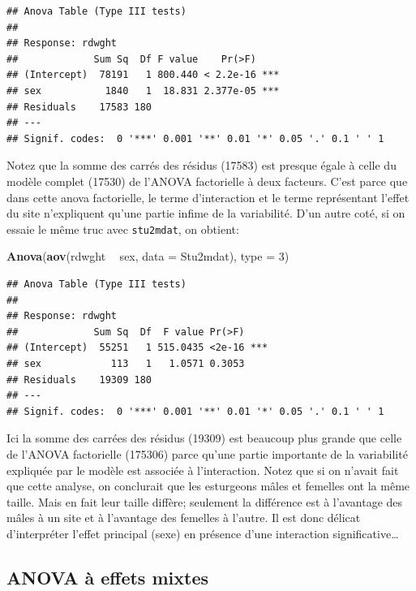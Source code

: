 \documentclass[12pt,]{book}
\newenvironment{Shaded}{\begin{snugshade}}{\end{snugshade}}
\newcommand{\DataTypeTok}[1]{\textcolor[rgb]{0.13,0.29,0.53}{#1}}
\newcommand{\DecValTok}[1]{\textcolor[rgb]{0.00,0.00,0.81}{#1}}
\newcommand{\KeywordTok}[1]{\textcolor[rgb]{0.13,0.29,0.53}{\textbf{#1}}}
\newcommand{\NormalTok}[1]{#1}
\newcommand{\OperatorTok}[1]{\textcolor[rgb]{0.81,0.36,0.00}{\textbf{#1}}}
\newcommand{\StringTok}[1]{\textcolor[rgb]{0.31,0.60,0.02}{#1}}
\begin{document}
\begin{verbatim}
## Anova Table (Type III tests)
## 
## Response: rdwght
##             Sum Sq  Df F value    Pr(>F)    
## (Intercept)  78191   1 800.440 < 2.2e-16 ***
## sex           1840   1  18.831 2.377e-05 ***
## Residuals    17583 180                      
## ---
## Signif. codes:  0 '***' 0.001 '**' 0.01 '*' 0.05 '.' 0.1 ' ' 1
\end{verbatim}

Notez que la somme des carrés des résidus (17583) est presque égale à celle du modèle complet (17530) de l'ANOVA factorielle à deux facteurs. C'est parce que dans cette anova factorielle, le terme d'interaction et le terme représentant l'effet du site n'expliquent qu'une partie infime de la variabilité. D'un autre coté, si on essaie le même truc avec \texttt{stu2mdat}, on obtient:

\begin{Shaded}
\begin{Highlighting}[]
\KeywordTok{Anova}\NormalTok{(}\KeywordTok{aov}\NormalTok{(rdwght }\OperatorTok{~}\StringTok{ }\NormalTok{sex, }\DataTypeTok{data =}\NormalTok{ Stu2mdat), }\DataTypeTok{type =} \DecValTok{3}\NormalTok{)}
\end{Highlighting}
\end{Shaded}

\begin{verbatim}
## Anova Table (Type III tests)
## 
## Response: rdwght
##             Sum Sq  Df  F value Pr(>F)    
## (Intercept)  55251   1 515.0435 <2e-16 ***
## sex            113   1   1.0571 0.3053    
## Residuals    19309 180                    
## ---
## Signif. codes:  0 '***' 0.001 '**' 0.01 '*' 0.05 '.' 0.1 ' ' 1
\end{verbatim}

Ici la somme des carrées des résidus (19309) est beaucoup plus grande que celle de l'ANOVA factorielle (175306) parce qu'une partie importante de la variabilité expliquée par le modèle est associée à l'interaction. Notez que si on n'avait fait que cette analyse, on conclurait que les esturgeons mâles et femelles ont la même taille. Mais en fait leur taille diffère; seulement la différence est à l'avantage des mâles à un site et à l'avantage des femelles à l'autre. Il est donc délicat d'interpréter l'effet principal (sexe) en présence d'une interaction significative\ldots{}

\hypertarget{anova-uxe0-effets-mixtes}{%
\subsection{ANOVA à effets mixtes}\label{anova-uxe0-effets-mixtes}}
\end{document}
